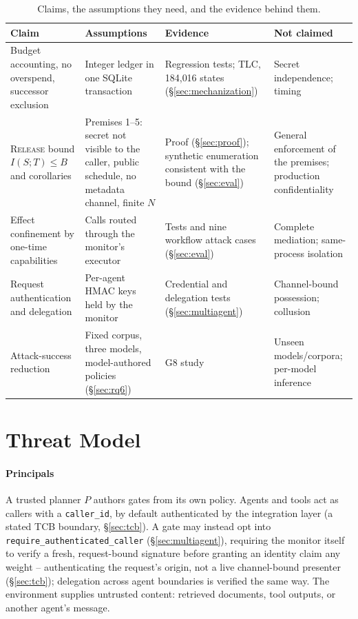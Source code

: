 \documentclass[conference,compsoc]{IEEEtran}
\newcommand{\rev}[1]{#1} %
\begin{document}
\begin{table}[t]
\centering
\caption{\rev{Claims, the assumptions they need, and the evidence behind them.}}
\label{tab:claims}
\rev{\footnotesize
\begin{tabular}{p{}p{0.26\textwidth}p{0.25\textwidth}p{0.19\textwidth}}
\hline
Claim & Assumptions & Evidence & Not claimed \\
\hline
Budget accounting, no overspend, successor exclusion & Integer ledger in one SQLite transaction & Regression tests; TLC, 184{,}016 states (\S\ref{sec:mechanization}) & Secret independence; timing \\
\textsc{Release} bound $I(S;T)\le B$ and corollaries & Premises 1--5: secret not visible to the caller, public schedule, no metadata channel, finite $N$ & Proof (\S\ref{sec:proof}); synthetic enumeration consistent with the bound (\S\ref{sec:eval}) & General enforcement of the premises; production confidentiality \\
Effect confinement by one-time capabilities & Calls routed through the monitor's executor & Tests and nine workflow attack cases (\S\ref{sec:eval}) & Complete mediation; same-process isolation \\
Request authentication and delegation & Per-agent HMAC keys held by the monitor & Credential and delegation tests (\S\ref{sec:multiagent}) & Channel-bound possession; collusion \\
Attack-success reduction & Fixed corpus, three models, model-authored policies (\S\ref{sec:rq6}) & G8 study & Unseen models/corpora; per-model inference \\
\hline
\end{tabular}}
\end{table}

\section{Threat Model}
\label{sec:threat}

\paragraph{Principals} A trusted planner $P$ authors gates from its own
policy. Agents and tools act as callers with a \texttt{caller\_id}, by
default authenticated by the integration layer (a stated TCB boundary,
\S\ref{sec:tcb}). A gate may instead opt into
\texttt{require\_authenticated\_caller} (\S\ref{sec:multiagent}), requiring
the monitor itself to verify a fresh, request-bound signature before
granting an identity claim any weight -- authenticating the request's
origin, not a live channel-bound presenter (\S\ref{sec:tcb}); delegation
across agent boundaries is verified the same way. The environment
supplies untrusted content:
retrieved documents, tool outputs, or another agent's message.
\end{document}
